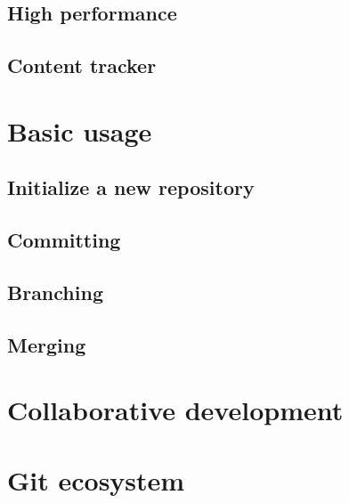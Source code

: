 \documentclass{beamer}
\begin{document}
\subsection{High performance}

\subsection{Content tracker}

\section{Basic usage}

\subsection{Initialize a new repository}

\subsection{Committing}

\subsection{Branching}

\subsection{Merging}

\section{Collaborative development}

\section{Git ecosystem}
\end{document}
